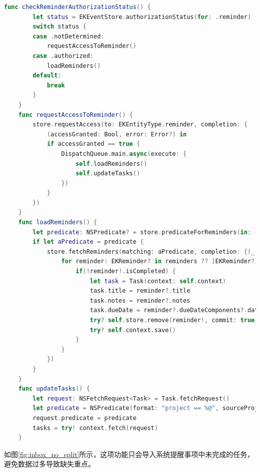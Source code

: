 \begin{lstlisting}[language={Swift}, caption={请求提醒事项权限并导入系统代码逻辑}]
	func checkReminderAuthorizationStatus() {
        let status = EKEventStore.authorizationStatus(for: .reminder)
        switch status {
        case .notDetermined:
            requestAccessToReminder()
        case .authorized:
            loadReminders()
        default:
            break
        }
    }
    func requestAccessToReminder() {
        store.requestAccess(to: EKEntityType.reminder, completion: {
            (accessGranted: Bool, error: Error?) in
            if accessGranted == true {
                DispatchQueue.main.async(execute: {
                    self.loadReminders()
                    self.updateTasks()
                })
            }
        })
    }
    func loadReminders() {
        let predicate: NSPredicate? = store.predicateForReminders(in: [store.defaultCalendarForNewReminders()!])
        if let aPredicate = predicate {
            store.fetchReminders(matching: aPredicate, completion: {(_ reminders: [EKReminder]?) -> Void in
                for reminder: EKReminder? in reminders ?? [EKReminder?]() {
                    if(!reminder!.isCompleted) {
                        let task = Task(context: self.context)
                        task.title = reminder?.title
                        task.notes = reminder?.notes
                        task.dueDate = reminder?.dueDateComponents?.date
                        try? self.store.remove(reminder!, commit: true)
                        try? self.context.save()
                    }
                }
            })
        }
    }
    func updateTasks() {
        let request: NSFetchRequest<Task> = Task.fetchRequest()
        let predicate = NSPredicate(format: "project == %@", sourceProject ?? 0)
        request.predicate = predicate
        tasks = try! context.fetch(request)
    }
\end{lstlisting}

如图\ref{fig:inbox_no_split}所示，这项功能只会导入系统提醒事项中未完成的任务，避免数据过多导致缺失重点。

